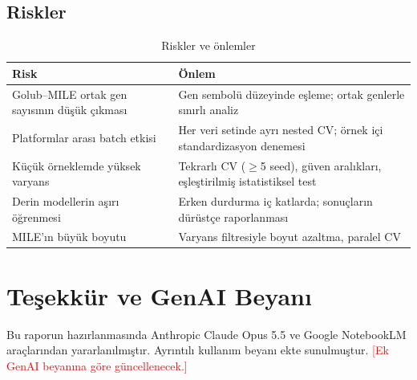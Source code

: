 \documentclass[conference]{IEEEtran}
\newcommand{\todo}[1]{\textcolor{red}{[#1]}}
\begin{document}
\subsection{Riskler}
\begin{table}[htbp]
\caption{Riskler ve önlemler}
\centering
\footnotesize
\begin{tabularx}{\columnwidth}{@{}L L@{}}
\toprule
Risk & Önlem \\
\midrule
Golub--MILE ortak gen sayısının düşük çıkması & Gen sembolü düzeyinde eşleme; ortak genlerle sınırlı analiz \\
Platformlar arası batch etkisi & Her veri setinde ayrı nested CV; örnek içi standardizasyon denemesi \\
Küçük örneklemde yüksek varyans & Tekrarlı CV ($\geq$5 seed), güven aralıkları, eşleştirilmiş istatistiksel test \\
Derin modellerin aşırı öğrenmesi & Erken durdurma iç katlarda; sonuçların dürüstçe raporlanması~\cite{grinsztajn2022} \\
MILE'ın büyük boyutu & Varyans filtresiyle boyut azaltma, paralel CV \\
\bottomrule
\end{tabularx}
\end{table}

\section*{Teşekkür ve GenAI Beyanı}
Bu raporun hazırlanmasında Anthropic Claude Opus 5.5 ve Google NotebookLM araçlarından yararlanılmıştır. Ayrıntılı kullanım beyanı ekte sunulmuştur. \todo{Ek GenAI beyanına göre güncellenecek.}
\end{document}
